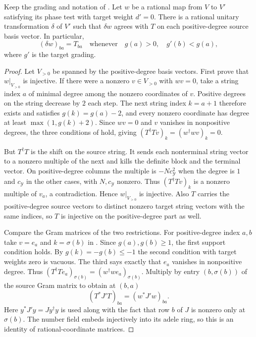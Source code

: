 \begin{lemma}
\label{lem:a-bessel-rational-chord-representative}
\emitthmsource
Keep the grading and notation of . Let $w$ be a rational map from $V$ to $V'$ satisfying its phase test with target weight $d'=0$. There is a rational unitary transformation $\delta$ of $V'$ such that $\delta w$ agrees with $T$ on each positive-degree source basis vector. In particular,
\[
 (\delta w)_{ba}=T_{ba}
 \quad\text{whenever}\quad
        g(a)>0,\quad g'(b)<g(a),
\]
where $g'$ is the target grading.
\end{lemma}
\begin{proof}
Let $V_{>0}$ be spanned by the positive-degree basis vectors. First prove that $w|_{V_{>0}}$ is injective. If there were a nonzero $v\in V_{>0}$ with $wv=0$, take a string index $a$ of minimal degree among the nonzero coordinates of $v$. Positive degrees on the string decrease by $2$ each step. The next string index $k=a+1$ therefore exists and satisfies $g(k)=g(a)-2$, and every nonzero coordinate has degree at least $\max(1,g(k)+2)$. Since $wv=0$ and $v$ vanishes in nonpositive degrees, the three conditions of  hold, giving $(T^\dagger T v)_k=(w^\dagger wv)_k=0$.

But $T^\dagger T$ is the shift on the source string. It sends each nonterminal string vector to a nonzero multiple of the next and kills the definite block and the terminal vector. On positive-degree columns the multiple is $-Nc_{\mathcal Y}^2$ when the degree is $1$ and $c_{\mathcal Y}$ in the other cases, with $N,c_{\mathcal Y}$ nonzero. Thus $(T^\dagger Tv)_k$ is a nonzero multiple of $v_a$, a contradiction. Hence $w|_{V_{>0}}$ is injective. Also $T$ carries the positive-degree source vectors to distinct nonzero target string vectors with the same indices, so $T$ is injective on the positive-degree part as well.

Compare the Gram matrices of the two restrictions. For positive-degree index $a,b$ take $v=e_a$ and $k=\sigma(b)$ in . Since $g(a),g(b)\ge1$, the first support condition holds. By $g(k)=-g(b)\le-1$ the second condition with target weights zero is vacuous. The third says exactly that $e_a$ vanishes in nonpositive degree. Thus $(T^\dagger T e_a)_{\sigma(b)}=(w^\dagger w e_a)_{\sigma(b)}$. Multiply by entry $(b,\sigma(b))$ of the source Gram matrix to obtain at $(b,a)$
\[
 (T^\ast J'T)_{ba}=(w^\ast J'w)_{ba}.
\]
Here $y^\ast J'y=Jy^\dagger y$ is used along with the fact that row $b$ of $J$ is nonzero only at $\sigma(b)$. The number field embeds injectively into its adele ring, so this is an identity of rational-coordinate matrices.


\end{proof}
